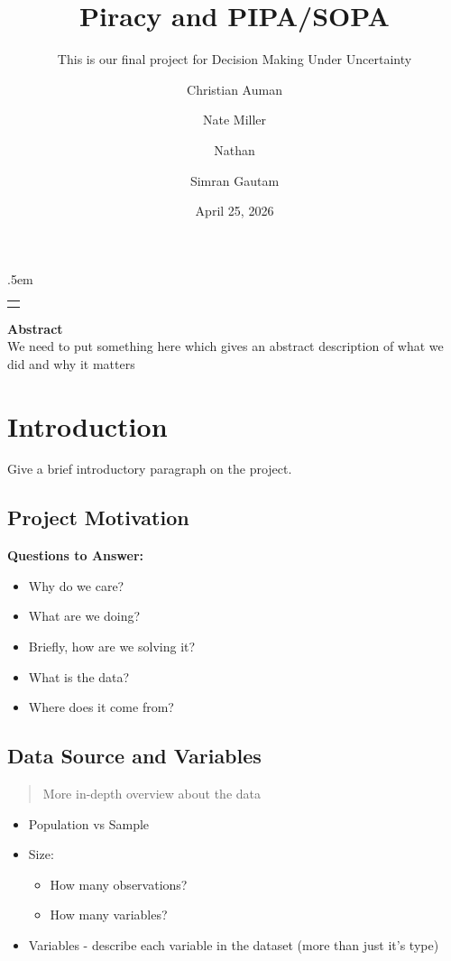 \documentclass[
  american,
  11pt,
  letterpaper,
]{article}
\title{Piracy and PIPA/SOPA}
\subtitle{This is our final project for Decision Making Under
Uncertainty}
\author{Christian Auman \and Nate Miller \and Nathan \and Simran Gautam}
\date{April 25, 2026}
\makeatletter
\providecommand{\tightlist}{%
  \setlength{\itemsep}{0pt}\setlength{\parskip}{0pt}}
\renewcommand{\maketitle}{
  \begin{titlepage}
  \thispagestyle{empty}
  \vspace*{\fill}

  \begin{center}
    {\LARGE \@title \par}
    \vspace{1em}

    {\large
    \lineskip .5em
    \begin{tabular}[t]{c}
    \@author
    \end{tabular}\par}

    \vspace{1em}
    {\large \@date \par}

    \vspace{2em}
    \begin{minipage}{0.7\textwidth}
    \centering
    \textbf{Abstract}\\[0.5em]
    We need to put something here which gives an abstract description of what we did and why it matters
    \end{minipage}
  \end{center}

  \vspace*{\fill}
  \end{titlepage}
}
\makeatother
\begin{document}
\maketitle

{
\setcounter{tocdepth}{2}
\tableofcontents
}
\section{Introduction}\label{introduction}

Give a brief introductory paragraph on the project.

\subsection{Project Motivation}\label{project-motivation}

\textbf{Questions to Answer:}

\begin{itemize}
\tightlist
\item
  Why do we care?
\item
  What are we doing?
\item
  Briefly, how are we solving it?
\item
  What is the data?
\item
  Where does it come from?
\end{itemize}

\subsection{Data Source and Variables}\label{data-source-and-variables}

\begin{quote}
More in-depth overview about the data
\end{quote}

\begin{itemize}
\tightlist
\item
  Population vs Sample
\item
  Size:

  \begin{itemize}
  \tightlist
  \item
    How many observations?
  \item
    How many variables?
  \end{itemize}
\item
  Variables - describe each variable in the dataset (more than just it's
  type)
\end{itemize}
\end{document}
